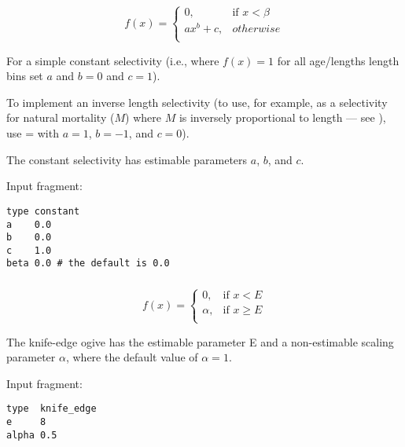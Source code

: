 \begin{equation}
f(x)= \begin{cases}
	0, & \text{if $x < \beta$} \\
	ax^b + c, & otherwise \\
\end{cases}
\end{equation}

For a simple constant selectivity (i.e., where $f(x) = 1$ for all \ifAgeBased age/lengths \else length bins \fi set $a$ and $b = 0$ and $c = 1$). 

To implement an inverse length selectivity (to use, for example, as a selectivity for natural mortality ($M$) where $M$ is inversely proportional to length --- see \cite{lorenzen_natural_2022}), use \ifAgeBased {}= with \fi $a=1$, $b=-1$, and $c=0$).

The constant selectivity has estimable parameters $a$, $b$, and $c$.

Input fragment: {\small{\begin{verbatim}
type constant
a    0.0
b    0.0
c    1.0
beta 0.0 # the default is 0.0
\end{verbatim}}}

\subsubsection[Knife-edge]{}\label{sec:Selectivity-KnifeEdge} 

\begin{equation}
f(x)= \begin{cases}
  0, & \text{if $x < E$} \\
  \alpha, & \text{if $x \ge E$}\\
  \end{cases}
\end{equation}

The knife-edge ogive has the estimable parameter E and a non-estimable scaling parameter $\alpha$, where the default value of $\alpha = 1$.

Input fragment: {\small{\begin{verbatim}
type  knife_edge
e     8
alpha 0.5
\end{verbatim}}}

\subsubsection[All-values]{}\label{sec:Selectivity-AllValues}

